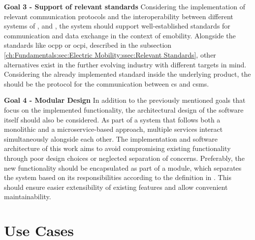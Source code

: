 \noindent \textbf{Goal 3 - Support of relevant standards} Considering the implementation of relevant communication protocols and the interoperability between different systems of ,  and , the system should support well-established standards for communication and data exchange in the context of \acrshort{emobility}. 
Alongside the standards like \acrshort{ocpp} or \acrshort{ocpi}, described in the subsection \ref{ch:Fundamentals:sec:Electric Mobility:ssec:Relevant Standards}, other alternatives exist in the further evolving industry with different targets in mind. 
Considering the already implemented standard inside the underlying product, the  should be the protocol for the communication between \acrshort{cs} and \acrshort{csms}.

\noindent \textbf{Goal 4 - Modular Design} In addition to the previously mentioned goals that focus on the implemented functionality, the architectural design of the software itself should also be considered. 
As part of a system that follows both a monolithic and a microservice-based approach, multiple services interact simultaneously alongside each other. The implementation and software architecture of this work aims to avoid compromising existing functionality through poor design choices or neglected separation of concerns. 
Preferably, the new functionality should be encapsulated as part of a module, which separates the system based on its responsibilities according to the definition in \cite{clements_documenting_2011}. This should ensure easier extensibility of existing features and allow convenient maintainability.

\section{Use Cases}
\label{ch:Requirements Engineering:sec:Use Cases}

